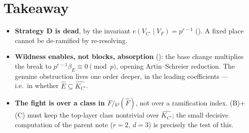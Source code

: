 \documentclass[11pt]{article}
\begin{document}
\section{Takeaway}\label{sec:takeaway}
\begin{itemize}
  \item \textbf{Strategy D is dead}, by the invariant $e(V_{C'}\mid V_F)=p^{r-1}$
        (). A fixed place cannot be de-ramified by
        re-resolving.
  \item \textbf{Wildness enables, not blocks, absorption} ():
        the base change multiplies the break to $p^{r-1}\beta_E\equiv0\!\!\pmod p$,
        opening Artin--Schreier reduction. The genuine obstruction lives one
        order deeper, in the leading coefficients --- i.e.\ in whether
        $\widehat E\subseteq\widehat{K_{C'}}$.
  \item \textbf{The fight is over a class in $\widehat F/\wp(\widehat F)$}, not
        over a ramification index. (B)+(C) must keep the top-layer class
        nontrivial over $\widehat{K_{C'}}$; the small decisive computation of the
        parent note ($r=2$, $d=3$) is precisely the test of this.
\end{itemize}

\printbibliography
\end{document}
